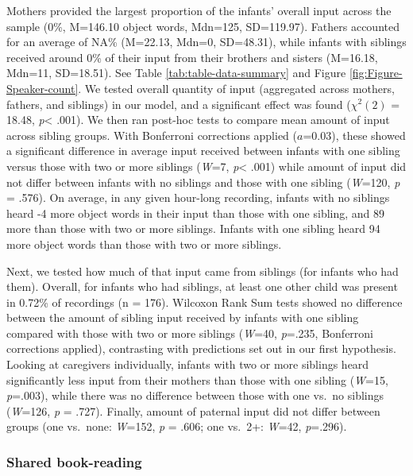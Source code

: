 \documentclass[
  english,
  man,floatsintext]{apa6}
\begin{document}
Mothers provided the largest proportion of the infants' overall input across the sample (0\%, M=146.10 object words, Mdn=125, SD=119.97). Fathers accounted for an average of NA\% (M=22.13, Mdn=0, SD=48.31), while infants with siblings received around 0\% of their input from their brothers and sisters (M=16.18, Mdn=11, SD=18.51). See Table \ref{tab:table-data-summary} and Figure \ref{fig:Figure-Speaker-count}. We tested overall quantity of input (aggregated across mothers, fathers, and siblings) in our model, and a significant effect was found (\(\chi^2 (2)\) = 18.48, \emph{p}\textless{} .001). We then ran post-hoc tests to compare mean amount of input across sibling groups. With Bonferroni corrections applied (\(a\)=0.03), these showed a significant difference in average input received between infants with one sibling versus those with two
or more siblings (\emph{W}=7, \emph{p}\textless{} .001) while amount of input did not differ between infants with no siblings and those with one sibling (\emph{W}=120, \emph{p} = .576). On average, in any given hour-long recording, infants with no siblings heard -4 more object words in their input than those with one sibling, and 89 more than those with two or more siblings. Infants with one sibling heard 94 more object words than those with two or more siblings.

Next, we tested how much of that input came from siblings (for infants who had them). Overall, for infants who had siblings, at least one other child was present in 0.72\% of recordings (n = 176). Wilcoxon Rank Sum tests showed no difference between the amount of sibling input received by infants with one sibling compared with those with two or more siblings (\emph{W}=40, \emph{p}=.235, Bonferroni corrections applied), contrasting with predictions set out in our first hypothesis. Looking at caregivers individually, infants with two or more siblings heard significantly less input from their mothers than those with one sibling (\emph{W}=15, \emph{p}=.003), while there was no difference between those with one vs.~no siblings (\emph{W}=126, \emph{p} = .727). Finally, amount of paternal input did not differ between groups (one vs.~none: \emph{W}=152, \emph{p} = .606; one vs.~2+: \emph{W}=42, \emph{p}=.296).

\hypertarget{shared-book-reading}{%
\subsubsection{Shared book-reading}\label{shared-book-reading}}
\end{document}
